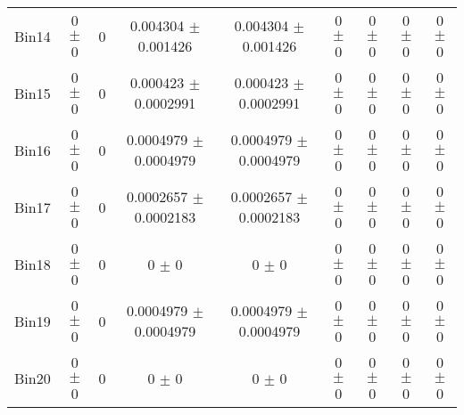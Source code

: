 \begin{tabular}{@{\extracolsep{4pt}}lcccccccc@{}}
     Bin14 & 0 $\pm$ 0 & 0 & 0.004304 $\pm$ 0.001426 & 0.004304 $\pm$ 0.001426 & 0 $\pm$ 0 & 0 $\pm$ 0 & 0 $\pm$ 0 & 0 $\pm$ 0 \\ 
     Bin15 & 0 $\pm$ 0 & 0 & 0.000423 $\pm$ 0.0002991 & 0.000423 $\pm$ 0.0002991 & 0 $\pm$ 0 & 0 $\pm$ 0 & 0 $\pm$ 0 & 0 $\pm$ 0 \\ 
     Bin16 & 0 $\pm$ 0 & 0 & 0.0004979 $\pm$ 0.0004979 & 0.0004979 $\pm$ 0.0004979 & 0 $\pm$ 0 & 0 $\pm$ 0 & 0 $\pm$ 0 & 0 $\pm$ 0 \\ 
     Bin17 & 0 $\pm$ 0 & 0 & 0.0002657 $\pm$ 0.0002183 & 0.0002657 $\pm$ 0.0002183 & 0 $\pm$ 0 & 0 $\pm$ 0 & 0 $\pm$ 0 & 0 $\pm$ 0 \\ 
     Bin18 & 0 $\pm$ 0 & 0 & 0 $\pm$ 0 & 0 $\pm$ 0 & 0 $\pm$ 0 & 0 $\pm$ 0 & 0 $\pm$ 0 & 0 $\pm$ 0 \\ 
     Bin19 & 0 $\pm$ 0 & 0 & 0.0004979 $\pm$ 0.0004979 & 0.0004979 $\pm$ 0.0004979 & 0 $\pm$ 0 & 0 $\pm$ 0 & 0 $\pm$ 0 & 0 $\pm$ 0 \\ 
     Bin20 & 0 $\pm$ 0 & 0 & 0 $\pm$ 0 & 0 $\pm$ 0 & 0 $\pm$ 0 & 0 $\pm$ 0 & 0 $\pm$ 0 & 0 $\pm$ 0 \\ 
\hline\hline
  \end{tabular}
